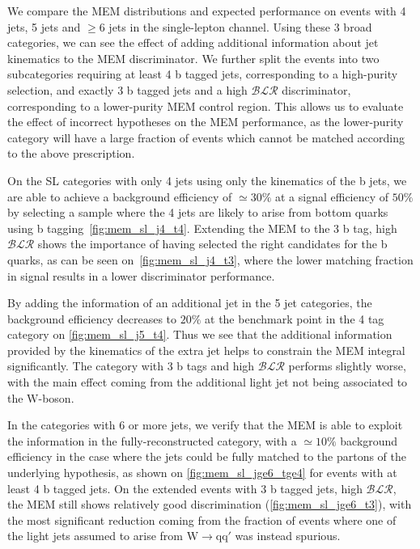 We compare the MEM distributions and expected performance on events with 4 jets, 5 jets and $\ge6$ jets in the single-lepton channel. Using these 3 broad categories, we can see the effect of adding additional information about jet kinematics to the MEM discriminator. We further split the events into two subcategories requiring at least 4 b tagged jets, corresponding to a high-purity selection, and exactly 3 b tagged jets and a high $\mathcal{BLR}$ discriminator, corresponding to a lower-purity MEM control region. This allows us to evaluate the effect of incorrect hypotheses on the MEM performance, as the lower-purity category will have a large fraction of events which cannot be matched according to the above prescription. 

On the SL categories with only 4 jets using only the kinematics of the b jets, we are able to achieve a background efficiency of $\simeq 30\%$ at a signal efficiency of $50\%$ by selecting a sample where the 4 jets are likely to arise from bottom quarks using b tagging~\cref{fig:mem_sl_j4_t4}. Extending the MEM to the 3 b tag, high $\mathcal{BLR}$ shows the importance of having selected the right candidates for the b quarks, as can be seen on~\cref{fig:mem_sl_j4_t3}, where the lower matching fraction in signal results in a lower discriminator performance.

By adding the information of an additional jet in the 5 jet categories, the background efficiency decreases to $20\%$ at the benchmark point in the 4 tag category on \cref{fig:mem_sl_j5_t4}. Thus we see that the additional information provided by the kinematics of the extra jet helps to constrain the MEM integral significantly. The category with 3 b tags and high $\mathcal{BLR}$ performs slightly worse, with the main effect coming from the additional light jet not being associated to the $\mathrm{W}$-boson.

In the categories with 6 or more jets, we verify that the MEM is able to exploit the information in the fully-reconstructed category, with a $\simeq 10\%$ background efficiency in the case where the jets could be fully matched to the partons of the underlying hypothesis, as shown on \cref{fig:mem_sl_jge6_tge4} for events with at least 4 b tagged jets. On the extended events with 3 b tagged jets, high $\mathcal{BLR}$, the MEM still shows relatively good discrimination (\cref{fig:mem_sl_jge6_t3}), with the most significant reduction coming from the fraction of events where one of the light jets assumed to arise from $\mathrm{W} \rightarrow \mathrm{q} \mathrm{q}'$ was instead spurious.

